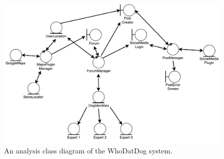 \documentclass[]{article}
\begin{document}
\begin{figure}[H]
\centering
\includegraphics[width=\textwidth]{3A04_D2_Analysis_Class_Diagram.pdf}
\caption{\label{fig:analysisclassdiagram}An analysis class diagram of the WhoDatDog system.}
\end{figure}
\end{document}
